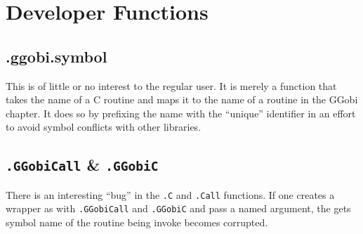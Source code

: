 \documentclass{article}
\def\SFunction#1{{\texttt{\red #1}}}
\begin{document}
\section{Developer Functions}

\subsection{.ggobi.symbol}
This is of little or no interest to the regular user.  It is merely a
function that takes the name of a C routine and maps it to the name of
a routine in the GGobi chapter.  It does so by prefixing the name with
the ``unique'' identifier  in an effort to avoid
symbol conflicts with other libraries.

\subsection{\SFunction{.GGobiCall} \& \SFunction{.GGobiC}}

There is an interesting ``bug'' in the \SFunction{.C} and
\SFunction{.Call} functions. If one creates a wrapper as with
\SFunction{.GGobiCall} and \SFunction{.GGobiC} and pass a named
argument, the gets symbol name of the routine being invoke becomes
corrupted.
\end{document}
